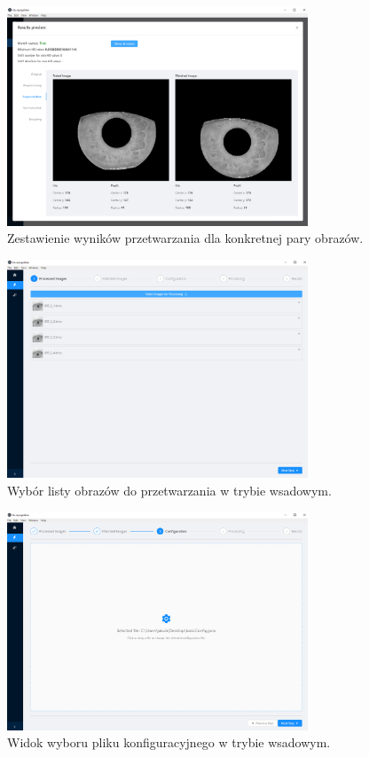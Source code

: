 \documentclass[10pt,polish,a4paper,oneside]{ppfcmthesis}
\begin{document}
\begin{figure}[ht]
  \centering
  \includegraphics[width=0.8\textwidth]{images/app/resultsPreviewSegmentation.png}
  \caption{Zestawienie wyników przetwarzania dla konkretnej pary obrazów.}
  \label{fig:stepResultPreview}
\end{figure}

\begin{figure}[ht]
  \centering
  \includegraphics[width=0.8\textwidth]{images/app/batchProcessing.png}
  \caption{Wybór listy obrazów do przetwarzania w trybie wsadowym.}
  \label{fig:batchFiles}
\end{figure}

\begin{figure}[ht]
  \centering
  \includegraphics[width=0.8\textwidth]{images/app/batchConfigSelected.png}
  \caption{Widok wyboru pliku konfiguracyjnego w trybie wsadowym.}
  \label{fig:batchConfig}
\end{figure}
\end{document}
